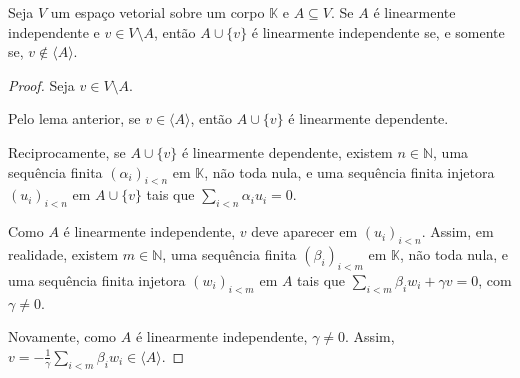 \begin{lemma}
    Seja $V$ um espaço vetorial sobre um corpo $\mathbb K$ e $A \subseteq V$.
    Se $A$ é linearmente independente e $v \in V\setminus A$, então $A \cup \{v\}$ é linearmente independente se, e somente se, $v \notin \langle A \rangle$.
\end{lemma}
\begin{proof}
    Seja $v \in V\setminus A$.
    
    Pelo lema anterior, se $v \in \langle A \rangle$, então $A \cup \{v\}$ é linearmente dependente.

    Reciprocamente, se $A\cup\{v\}$ é linearmente dependente, existem $n \in \mathbb N$, uma sequência finita $(\alpha_i)_{i<n}$ em $\mathbb K$, não toda nula, e uma sequência finita injetora $(u_i)_{i<n}$ em $A \cup \{v\}$ tais que $\sum_{i<n} \alpha_i u_i = 0$.

    Como $A$ é linearmente independente, $v$ deve aparecer em $(u_i)_{i<n}$.
    Assim, em realidade, existem $m \in \mathbb N$, uma sequência finita $(\beta_i)_{i<m}$ em $\mathbb K$, não toda nula, e uma sequência finita injetora $(w_i)_{i<m}$ em $A$ tais que $\sum_{i<m} \beta_i w_i + \gamma v = 0$, com $\gamma \neq 0$.

    Novamente, como $A$ é linearmente independente, $\gamma \neq 0$.
    Assim, $v = -\frac{1}{\gamma} \sum_{i<m} \beta_i w_i \in \langle A \rangle$.
\end{proof}